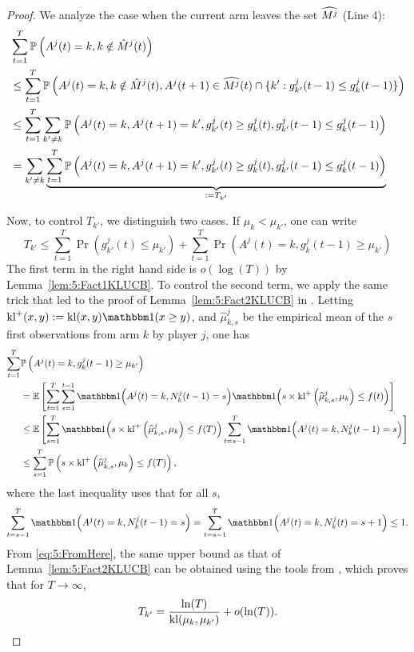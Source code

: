 \begin{proof}
  We analyze the case when the current arm leaves the set $\widehat{M^j}$ (Line 4):
  \begin{align*}
    & \sum_{t=1}^T \mathbb{P}\left(A^j(t) = k, k \notin \hat{M}^j(t)\right)  \\ & \leq \sum_{t=1}^T \mathbb{P}\left(A^j(t) = k, k \notin \hat{M}^j(t), A^j(t+1) \in \widehat{M^j}(t) \cap \{k': g_{k'}^j(t-1) \leq g_k^j(t-1)\}\right) \\
    & \leq   \sum_{t=1}^T \sum_{k' \neq k}\mathbb{P}\left(A^j(t) = k,A^j(t+1) = k', g_{k'}^j(t) \geq g_{k}^j(t), g_{k'}^j(t-1) \leq g_{k}^j(t-1)  \right) \\
    & = \sum_{k' \neq k} \underbrace{\sum_{t=1}^T \mathbb{P}\left(A^j(t) = k,A^j(t+1) = k', g_{k'}^j(t) \geq g_{k}^j(t), g_{k'}^j(t-1) \leq g_{k}^j(t-1)  \right)}_{:= T_{k'}}
  \end{align*}

  Now, to control $T_{k'}$, we distinguish two cases. If $\mu_k < \mu_{k'}$, one can write
  \[T_{k'} \leq \sum_{t=1}^T \Pr\left(g_{k'}^j(t) \leq \mu_{k'}\right) + \sum_{t=1}^T \Pr\left(A^j(t) = k, g_{k}^j(t-1) \geq \mu_{k'}\right)\]
  The first term in the right hand side is $o(\log(T))$ by Lemma~\ref{lem:5:Fact1KLUCB}. To control the second term, we apply the same trick that led to the proof of Lemma~\ref{lem:5:Fact2KLUCB} in \cite{KLUCBJournal}.
  Letting $\kl^+(x, y) := \kl(x, y) \indic(x \geq y)$,
  and $\widehat{\mu}^j_{k,s}$ be the empirical mean of the $s$ first observations from arm $k$ by player $j$, one has
  \begin{align}
    \sum_{t=1}^T & \Pr\left(A^j(t) = k, g_{k}^j(t-1) \geq \mu_{k'}\right) \nonumber\\
    & =  \bE \left[ \sum_{t=1}^T\sum_{s=1}^{t-1} \indic{\left(A^j(t) = k , N^j_k(t-1) = s\right)}\indic{\left( s  \times \kl^+\left(\widehat{\mu}_{k,s}^j , \mu_k\right) \leq f(t)\right)} \right]\nonumber\\
    & \leq \bE \left[ \sum_{s=1}^{T}\indic{\left( s \times \kl^+\left(\widehat{\mu}_{k,s}^j , \mu_k\right) \leq f(T)\right)}\sum_{t=s-1}^T \indic{\left(A^j(t) = k , N^j_k(t-1) = s\right)} \right] \nonumber \\
    & \leq \sum_{s=1}^T \Pr\left( s \times \kl^+\left(\widehat{\mu}_{k,s}^j , \mu_k\right) \leq f(T)\right),\label{eq:5:FromHere}
  \end{align}
  where the last inequality uses that for all $s$, \[\sum_{t=s-1}^T \indic{\left(A^j(t) = k , N^j_k(t-1) = s\right)} = \sum_{t=s-1}^T \indic{\left(A^j(t) = k , N^j_k(t) = s + 1\right)} \leq 1.\]
  From \eqref{eq:5:FromHere}, the same upper bound as that of Lemma~\ref{lem:5:Fact2KLUCB} can be obtained using the tools from \cite{KLUCBJournal}, which proves that for $T\to\infty$,
  \[T_{k'} = \frac{\ln(T)}{\mathrm{kl}(\mu_k,\mu_{k'})} + o(\ln(T)).\]


\end{proof}
